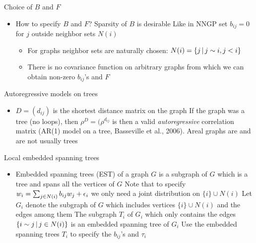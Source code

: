 \begin{frame}{Choice of $B$ and $F$}
	\begin{itemize}
		\item How to specify $B$ and $F$?
		\myitem Sparsity of $B$ is desirable
		\myitem Like in NNGP set $b_{ij}=0$ for $j$ outside neighbor sets $N(i)$
		\begin{itemize}
			\item {} For graphs neighbor sets are naturally chosen: $N(i) = \{ j \,|\, j \sim i, j<i\}$
			\item {} There is no covariance function on arbitrary graphs from which we can obtain non-zero $b_{ij}$'s and $F$
		\end{itemize}
	\end{itemize}
\end{frame}

\begin{frame}{Autoregressive models on trees}
	\begin{itemize}
\item $D=(d_{ij})$ is the shortest distance matrix on the graph
		\myitem If the graph was a tree (no loops), then $\rho^D = (\rho^{d_{ij}}$ is then a valid \alert{\em autoregressive} correlation matrix (AR(1) model on a tree, Basseville et al., 2006).
		\myitem Areal graphs are  and are not usually trees
\end{itemize}
\end{frame}

\begin{frame}{Local embedded spanning trees}
	\begin{itemize}
		\item \alert{Embedded spanning trees (EST)} of a graph $G$ is a subgraph of $G$ which is a tree and spans all the vertices of $G$
		\myitem Note that to specify $w_i = \sum_{j \in N(i)} b_{ij}w_j + \epsilon_i$ we only need a joint distribution on $\{i\} \cup N(i)$
		\myitem Let $G_i$ denote the subgraph of $G$ which includes vertices $\{i\} \cup N(i)$ and the edges among them
		\myitem The subgraph $T_i$ of $G_i$ which only contains the edges $\{ i \sim j \,|\, j \in N(i)\}$ is an embedded spanning tree of $G_i$
		\myitem Use the  embedded spanning trees $T_i$ to specify the $b_{ij}$'s and $\tau_i$
		
	\end{itemize}
\end{frame}

